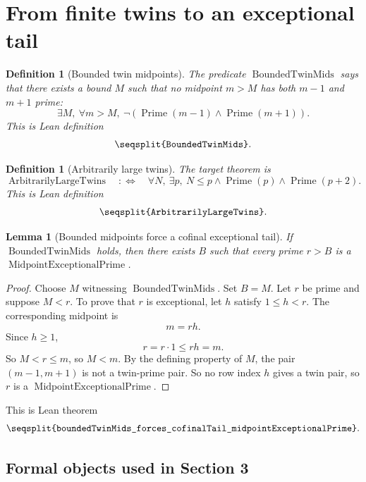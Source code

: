 \documentclass[11pt]{article}
\newtheorem{lemma}[theorem]{Lemma}
\newtheorem{definition}[theorem]{Definition}
\newcommand{\Prime}{\operatorname{Prime}}
\newcommand{\Lean}[1]{\texttt{\seqsplit{#1}}}
\begin{document}
\clearpage
\section{From finite twins to an exceptional tail}
\noindent

\begin{definition}[Bounded twin midpoints]
The predicate \(\operatorname{BoundedTwinMids}\) says that there exists a bound
\(M\) such that no midpoint \(m>M\) has both \(m-1\) and \(m+1\) prime:
\[
  \exists M,\ \forall m>M,\ 
    \neg(\Prime(m-1)\wedge\Prime(m+1)).
\]
This is Lean definition
\[
  \Lean{BoundedTwinMids}.
\]
\end{definition}

\begin{definition}[Arbitrarily large twins]
The target theorem is
\[
  \operatorname{ArbitrarilyLargeTwins}
  \quad:\Longleftrightarrow\quad
  \forall N,\ \exists p,\ N\le p\wedge\Prime(p)\wedge\Prime(p+2).
\]
This is Lean definition
\[
  \Lean{ArbitrarilyLargeTwins}.
\]
\end{definition}

\begin{lemma}[Bounded midpoints force a cofinal exceptional tail]
If \(\operatorname{BoundedTwinMids}\) holds, then there exists \(B\) such that
every prime \(r>B\) is a \(\operatorname{MidpointExceptionalPrime}\).
\end{lemma}

\begin{proof}
Choose \(M\) witnessing \(\operatorname{BoundedTwinMids}\).  Set \(B=M\).
Let \(r\) be prime and suppose \(M<r\).  To prove that \(r\) is exceptional,
let \(h\) satisfy \(1\le h<r\).  The corresponding midpoint is
\[
  m=rh.
\]
Since \(h\ge 1\),
\[
  r=r\cdot 1\le rh=m.
\]
So \(M<r\le m\), so \(M<m\).  By the defining property of \(M\), the pair
\((m-1,m+1)\) is not a twin-prime pair.  So no row index \(h\) gives a
twin pair, so \(r\) is a \(\operatorname{MidpointExceptionalPrime}\).
\end{proof}

This is Lean theorem
\[
  \Lean{boundedTwinMids\_forces\_cofinalTail\_midpointExceptionalPrime}.
\]

\subsection{Formal objects used in Section 3}
\end{document}
